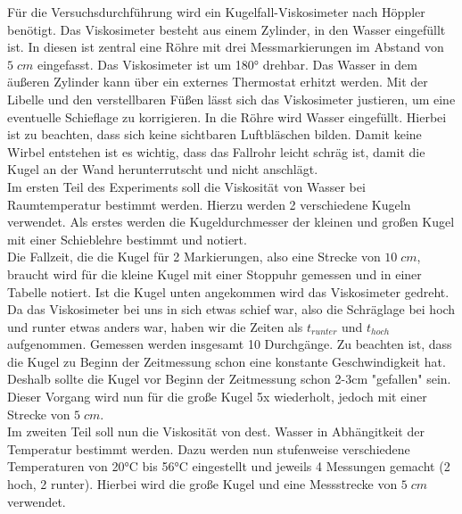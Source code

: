 Für die Versuchsdurchführung wird ein Kugelfall-Viskosimeter nach Höppler benötigt. Das Viskosimeter besteht aus einem Zylinder, in den Wasser eingefüllt ist. 
In diesen ist zentral eine Röhre mit drei Messmarkierungen im Abstand von $5\;\unit{cm}$ eingefasst. Das Viskosimeter ist um 180° drehbar.
Das Wasser in dem äußeren Zylinder kann über ein externes Thermostat erhitzt werden. Mit der Libelle und den verstellbaren Füßen lässt sich das Viskosimeter justieren, um
eine eventuelle Schieflage zu korrigieren. In die Röhre wird Wasser eingefüllt. Hierbei ist zu beachten, dass sich keine sichtbaren Luftbläschen bilden.
Damit keine Wirbel entstehen ist es wichtig, dass das Fallrohr leicht schräg ist, damit die Kugel an der Wand herunterrutscht und nicht anschlägt.
\\
Im ersten Teil des Experiments soll die Viskosität von Wasser bei Raumtemperatur bestimmt werden. Hierzu werden 2 verschiedene Kugeln verwendet. Als erstes werden die 
Kugeldurchmesser der kleinen und großen Kugel mit einer Schieblehre bestimmt und notiert. 
\\
Die Fallzeit, die die Kugel für 2 Markierungen, also eine Strecke von $10\;\unit{cm}$, braucht wird für die kleine Kugel mit einer Stoppuhr
gemessen und in einer Tabelle notiert. Ist die Kugel unten angekommen wird das Viskosimeter gedreht.
Da das Viskosimeter bei uns in sich etwas schief war, also die Schräglage bei hoch und runter etwas anders war, haben wir die Zeiten als $t_{runter}$ und $t_{hoch}$ aufgenommen.
Gemessen werden insgesamt 10 Durchgänge.
Zu beachten ist, dass die Kugel zu Beginn der Zeitmessung schon eine konstante Geschwindigkeit hat. Deshalb sollte die Kugel vor Beginn der Zeitmessung schon 2-3cm "gefallen" sein.
\\
Dieser Vorgang wird nun für die große Kugel 5x wiederholt, jedoch mit einer Strecke von $5\;\unit{cm}$.
\\
Im zweiten Teil soll nun die Viskosität von dest. Wasser in Abhängitkeit der Temperatur bestimmt werden. Dazu werden nun stufenweise verschiedene Temperaturen 
von 20°C bis 56°C eingestellt und jeweils 4 Messungen gemacht (2 hoch, 2 runter). Hierbei wird die große Kugel und eine Messstrecke von $5\;\unit{cm}$ verwendet.